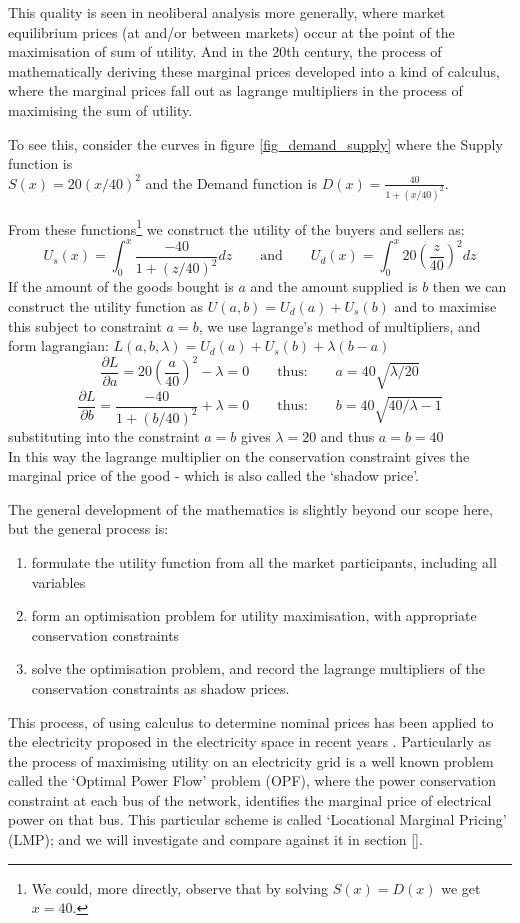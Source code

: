This quality is seen in neoliberal analysis more generally, where market equilibrium prices (at and/or between markets) occur at the point of the maximisation of sum of utility.
And in the 20th century, the process of mathematically deriving these marginal prices developed into a kind of calculus, where the marginal prices fall out as lagrange multipliers in the process of maximising the sum of utility.

To see this, consider the curves in figure \ref{fig_demand_supply} where the Supply function is\\ $S(x) = 20(x/40)^2$ and the Demand function is $D(x) = \frac{40}{1+(x/40)^2}$.


From these functions\footnote{We could, more directly, observe that by solving $S(x)=D(x)$ we get $x=40$.} we construct the utility of the buyers and sellers as:
$$U_s(x) = \int_0^x\frac{-40}{1+(z/40)^2}dz \quad\quad\text{and}\quad\quad U_d(x) = \int_0^x20\left(\frac{z}{40}\right)^2dz$$
If the amount of the goods bought is $a$ and the amount supplied is $b$ then we can construct the utility function as $U(a,b) = U_d(a) + U_s(b)$
and to maximise this subject to constraint $a=b$, we use lagrange's method of multipliers, and form lagrangian:
$L(a,b,\lambda) = U_d(a) + U_s(b) + \lambda(b-a)$
$$\frac{\partial L}{\partial a} = 20\left(\frac{a}{40}\right)^2 - \lambda = 0 \quad\quad\text{thus:}\quad\quad a = 40\sqrt{\lambda/20}$$
$$\frac{\partial L}{\partial b} = \frac{-40}{1+(b/40)^2} + \lambda = 0 \quad\quad\text{thus:}\quad\quad b = 40\sqrt{40/\lambda - 1}$$
substituting into the constraint $a=b$ gives $\lambda=20$ and thus $a=b=40$\\
In this way the lagrange multiplier on the conservation constraint gives the marginal price of the good - which is also called the `shadow price'.

The general development of the mathematics is slightly beyond our scope here, but the general process is:
\begin{enumerate}
\item formulate the utility function from all the market participants, including all variables
\item form an optimisation problem for utility maximisation, with appropriate conservation constraints
\item solve the optimisation problem, and record the lagrange multipliers of the conservation constraints as shadow prices.
\end{enumerate}
This process, of using calculus to determine nominal prices has been applied to the electricity proposed in the electricity space in recent years \cite{lmp1, lmp2, lmp4, game3}.
Particularly as the process of maximising utility on an electricity grid is a well known problem called the `Optimal Power Flow' problem (OPF), where the power conservation constraint at each bus of the network, identifies the marginal price of electrical power on that bus.
This particular scheme is called `Locational Marginal Pricing' (LMP); and we will investigate and compare against it in section \ref{}.



